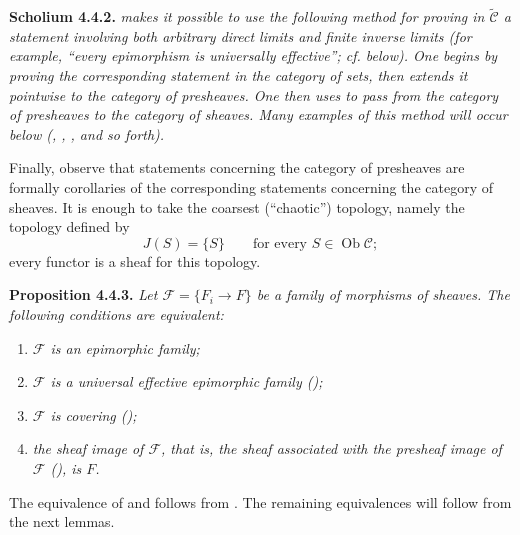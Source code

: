 \medskip
\noindent{}\textbf{Scholium 4.4.2.}
\textit{ makes it possible to use the following method for proving
in \(\widetilde{\mathscr C}\) a statement involving both arbitrary direct
limits and finite inverse limits (for example,
\textquotedblleft every epimorphism is universally
effective\textquotedblright; cf. below).
One begins by proving the corresponding statement in the category of sets,
then extends it pointwise to the category of presheaves. One then uses  to pass from the category of presheaves to the category of
sheaves. Many examples of this method will occur below (, , ,
and so forth).}

Finally, observe that statements concerning the category of presheaves are
formally corollaries of the corresponding statements concerning the category
of sheaves. It is enough to take the coarsest
(\textquotedblleft chaotic\textquotedblright)
topology, namely the topology defined by
\[
  J(S)=\{S\}
  \qquad\text{for every }S\in\operatorname{Ob}\mathscr C;
\]
every functor is a sheaf for this topology.

\medskip
\noindent{}\textbf{Proposition 4.4.3.}
\textit{Let \(\mathscr F=\{F_i\to F\}\) be a family of morphisms of sheaves.
The following conditions are equivalent:}
\begin{enumerate}
  \item[(i)] \textit{\(\mathscr F\) is an epimorphic family;}
  \item[(ii)] \textit{\(\mathscr F\) is a universal effective epimorphic
    family ();}
  \item[(iii)] \textit{\(\mathscr F\) is covering ();}
  \item[(iv)] \textit{the sheaf image of \(\mathscr F\), that is, the sheaf
    associated with the presheaf image of \(\mathscr F\) (), is \(F\).}
\end{enumerate}

The equivalence of  and  follows from . The remaining
equivalences will follow from the next lemmas.

